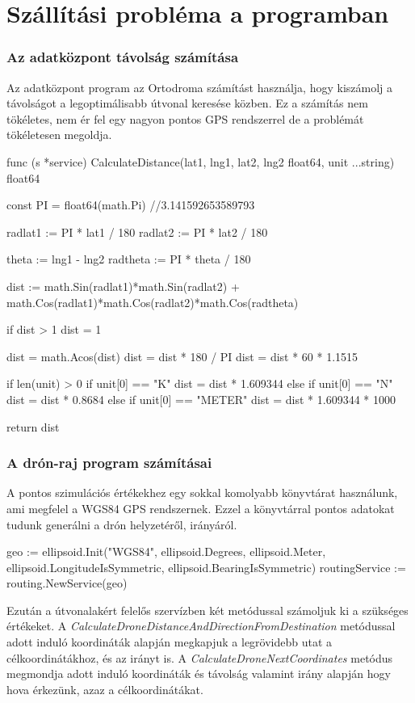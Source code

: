 \section{Szállítási probléma a programban}
\subsubsection{Az adatközpont távolság számítása}
Az adatközpont program az Ortodroma számítást használja, hogy kiszámolj a távolságot a legoptimálisabb útvonal keresése közben.
Ez a számítás nem tökéletes, nem ér fel egy nagyon pontos GPS rendszerrel de a problémát tökéletesen megoldja.
\begin{python}
    func (s *service) CalculateDistance(lat1, lng1, lat2,
            lng2 float64, unit ...string) float64 {
        const PI = float64(math.Pi) //3.141592653589793

        radlat1 := PI * lat1 / 180
        radlat2 := PI * lat2 / 180

        theta := lng1 - lng2
        radtheta := PI * theta / 180

        dist := math.Sin(radlat1)*math.Sin(radlat2) +
        math.Cos(radlat1)*math.Cos(radlat2)*math.Cos(radtheta)

        if dist > 1 {
            dist = 1
        }

        dist = math.Acos(dist)
        dist = dist * 180 / PI
        dist = dist * 60 * 1.1515

        if len(unit) > 0 {
            if unit[0] == "K" {
                dist = dist * 1.609344
            } else if unit[0] == "N" {
                dist = dist * 0.8684
            } else if unit[0] == "METER" {
                dist = dist * 1.609344 * 1000
            }
        }

        return dist
    }
\end{python}
\subsubsection{A drón-raj program számításai}
A pontos szimulációs értékekhez egy sokkal komolyabb könyvtárat használunk, ami megfelel a WGS84 GPS rendszernek.
Ezzel a könyvtárral pontos adatokat tudunk generálni a drón helyzetéről, irányáról.


\begin{python}

    geo := ellipsoid.Init("WGS84", ellipsoid.Degrees, ellipsoid.Meter,
    ellipsoid.LongitudeIsSymmetric, ellipsoid.BearingIsSymmetric)
    routingService := routing.NewService(geo)

\end{python}
Ezután a útvonalakért felelős szervízben két metódussal számoljuk ki a szükséges értékeket.
A \textit{CalculateDroneDistanceAndDirectionFromDestination} metódussal adott induló koordináták alapján megkapjuk a legrövidebb utat a célkoordinátákhoz, és az irányt is.
A \textit{CalculateDroneNextCoordinates} metódus megmondja adott induló koordináták és távolság valamint irány alapján hogy hova érkezünk, azaz a célkoordinátákat.

